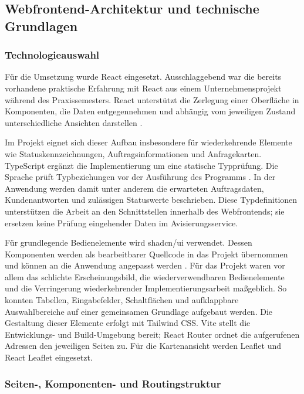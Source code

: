 \subsection{Webfrontend-Architektur und technische Grundlagen}

\subsubsection{Technologieauswahl}

Für die Umsetzung wurde React eingesetzt. Ausschlaggebend war die bereits vorhandene praktische
Erfahrung mit React aus einem Unternehmensprojekt während des Praxissemesters. React
unterstützt die Zerlegung einer Oberfläche in Komponenten, die Daten entgegennehmen und
abhängig vom jeweiligen Zustand unterschiedliche Ansichten darstellen
\parencite[vgl.][]{reactThinkingInReact}.

Im Projekt eignet sich dieser Aufbau insbesondere für wiederkehrende Elemente wie
Statuskennzeichnungen, Auftragsinformationen und Anfragekarten. TypeScript ergänzt die
Implementierung um eine statische Typprüfung. Die Sprache prüft Typbeziehungen vor der
Ausführung des Programms \parencite[vgl.][]{typescriptHandbook}. In der Anwendung werden damit
unter anderem die erwarteten Auftragsdaten, Kundenantworten und zulässigen Statuswerte
beschrieben. Diese Typdefinitionen unterstützen die Arbeit an den Schnittstellen innerhalb des
Webfrontends; sie ersetzen keine Prüfung eingehender Daten im Avisierungsservice.

Für grundlegende Bedienelemente wird shadcn/ui verwendet. Dessen Komponenten werden als
bearbeitbarer Quellcode in das Projekt übernommen und können an die Anwendung angepasst werden
\parencite[vgl.][]{shadcnIntroduction}. Für das Projekt waren vor allem das schlichte
Erscheinungsbild, die wiederverwendbaren Bedienelemente und die Verringerung wiederkehrender
Implementierungsarbeit maßgeblich. So konnten Tabellen, Eingabefelder, Schaltflächen und
aufklappbare Auswahlbereiche auf einer gemeinsamen Grundlage aufgebaut werden. Die Gestaltung
dieser Elemente erfolgt mit Tailwind CSS. Vite stellt die Entwicklungs- und Build-Umgebung
bereit; React Router ordnet die aufgerufenen Adressen den jeweiligen Seiten zu. Für die
Kartenansicht werden Leaflet und React Leaflet eingesetzt.

\subsubsection{Seiten-, Komponenten- und Routingstruktur}

